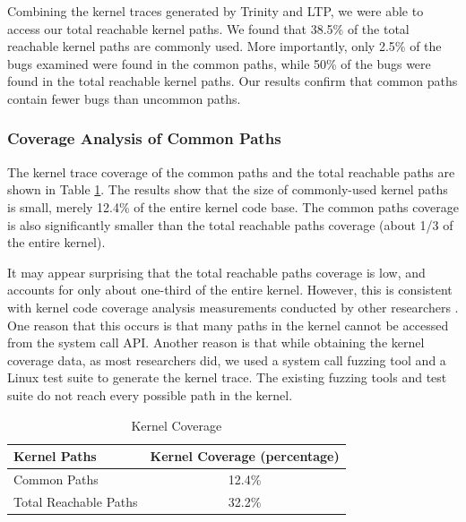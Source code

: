 Combining the kernel traces generated by Trinity and LTP, we were able to
access our total reachable kernel paths.
We found that 38.5\% of the total reachable
kernel paths are commonly used. 
More importantly, only 2.5\% of the bugs examined were found in the common
paths, 
while 50\% of the bugs were found in the total reachable kernel paths. 
Our results confirm that common paths contain fewer bugs than uncommon
paths. 

\subsubsection{Coverage Analysis of Common Paths}

The kernel trace coverage of the common paths and the total reachable paths
are shown in Table \ref{table:kernel_coverage}. 
The results show that the size of commonly-used kernel paths is small,
merely 12.4\% of the entire kernel code base. 
The common paths coverage is also significantly smaller than the total
reachable paths coverage 
(about 1/3 of the entire kernel).

It may appear surprising that the total reachable paths coverage is low, 
and accounts for only about one-third of the entire kernel.  However, 
this is consistent with kernel code coverage analysis 
measurements conducted by other researchers \cite{LTP-Coverage}.
One reason that this occurs is that many paths 
in the kernel cannot be accessed from the system call API. Another reason
is that 
while obtaining the kernel coverage data, as most researchers did, we used
a system call fuzzing tool 
and a Linux test suite to generate the kernel trace. The existing fuzzing
tools and test suite do not reach every possible path in the kernel.


\begin{table}
\centering
\scriptsize
\caption {Kernel Coverage}
\begin{tabular}{|l|c|}
  \hline
  \textbf{Kernel Paths} & \textbf{Kernel Coverage (percentage)} \\
  \hline \hline
  Common Paths & 12.4\% \\
  \hline
  Total Reachable Paths & 32.2\% \\
  \hline
\end{tabular}
\label{table:kernel_coverage}
\end{table}

